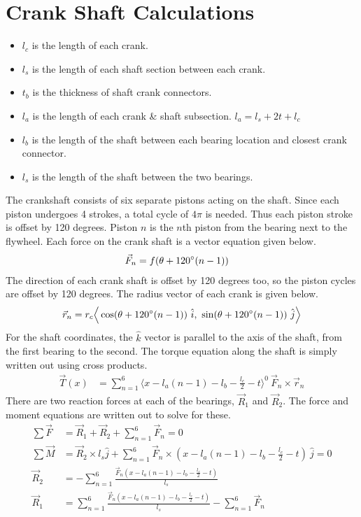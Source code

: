\documentclass[10pt,a4paper]{article}
\begin{document}
\section*{Crank Shaft Calculations}
\begin{itemize}
	\item $l_c$ is the length of each crank.
	\item $l_s$ is the length of each shaft section between each crank.
	\item $t_b$ is the thickness of shaft crank connectors.
	\item $l_a$ is the length of each crank \& shaft subsection. $l_a = l_s + 2t + l_c$
	\item $l_b$ is the length of the shaft between each bearing location and closest crank connector.
	\item $l_s$ is the length of the shaft between the two bearings.

\end{itemize}
The crankshaft consists of six separate pistons acting on the shaft. Since each piston undergoes 4 strokes, a total cycle of $4 \pi$ is needed. Thus each piston stroke is offset by 120 degrees. Piston $n$ is the $n$th piston from the bearing next to the flywheel. Each force on the crank shaft is a vector equation given below.
\begin{align}
	\vec{F}_n &= f(\theta + 120 \degree (n-1) )
\end{align}
The direction of each crank shaft is offset by 120 degrees too, so the piston cycles are offset by 120 degrees. The radius vector of each crank is given below.
\begin{align}
	\vec{r}_n = r_c \Big \langle \cos (\theta + 120 \degree (n-1)  )\ \hat{i},\ \sin (\theta + 120 \degree (n-1))\ \hat{j}  \Big \rangle
\end{align}
For the shaft coordinates, the $\hat{k}$ vector is parallel to the axis of the shaft, from the first bearing to the second. The torque equation along the shaft is simply written out using cross products.
\begin{align}
	\vec{T}(x) &= \sum_{n=1}^6 \langle x - l_a (n-1) - l_b - \frac{l_c}{2} - t\rangle^0\ \vec{F}_n \times \vec{r}_n 
\end{align}
There are two reaction forces at each of the bearings, $\vec{R}_1$ and $\vec{R}_2$. The force and moment equations are written out to solve for these.
\begin{align}
	\sum \vec{F} &= \vec{R}_1 + \vec{R}_2 + \sum_{n=1}^6 \vec{F}_n = 0 \\
	\sum \vec{M} &= \vec{R}_2 \times l_s \hat{j} + \sum_{n=1}^6 \vec{F}_n \times ( x - l_a (n-1) - l_b - \frac{l_c}{2} - t)\ \hat{j} = 0\\
	\vec{R}_2 &= - \sum_{n=1}^6 \frac{\vec{F}_n ( x - l_a (n-1) - l_b - \frac{l_c}{2} - t)}{l_s}\\
	\vec{R}_1 &= \sum_{n=1}^6 \frac{\vec{F}_n ( x - l_a (n-1) - l_b - \frac{l_c}{2} - t)}{l_s} - \sum_{n=1}^6 \vec{F}_n
\end{align}
\end{document}
